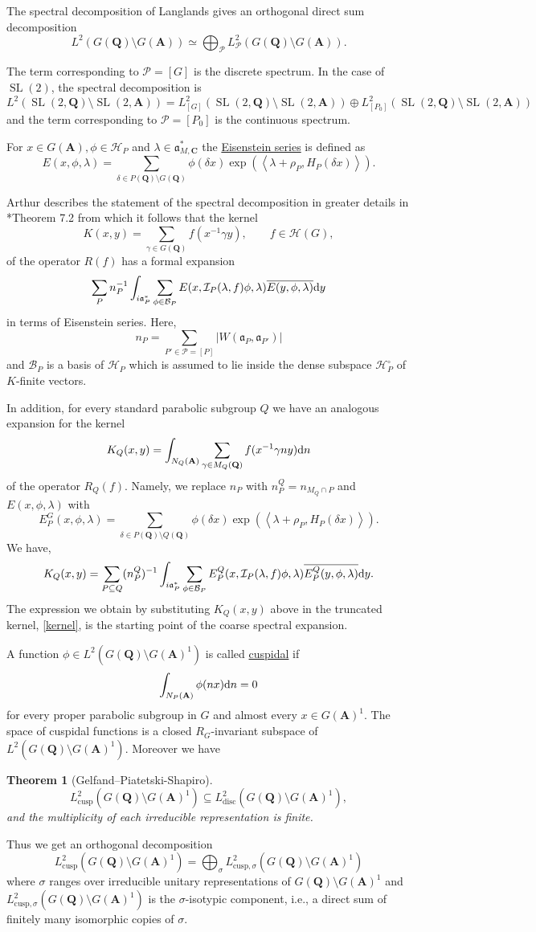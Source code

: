 \documentclass[11pt]{amsart}
\def\A{\mathbf A}
\def\C{\mathbf C}
\def\Q{\mathbf Q}
\def\BBB{\mathcal B}
\def\HHH{\mathcal H}
\def\III{\mathcal I}
\def\PPP{\mathcal P}
\def\aaa{\mathfrak a}
\def\d{\text d}
\def\bs{\setminus}
\def\cusp{\text{cusp}}
\def\disc{\text{disc}}
\def\Ltwo{L^2}
\def\mod#1{\lvert #1 \rvert} %
\def\sl{\operatorname{SL}}
\def\sprod#1#2{\left\langle #1 , #2 \right\rangle}  %
\newtheorem{theorem}{Theorem}[section]
\theoremstyle{remark}
\begin{document}
The spectral decomposition of Langlands gives an orthogonal direct sum decomposition
\[ \Ltwo(G(\Q)\bs G(\A)) \simeq \bigoplus_{\PPP} \Ltwo_\PPP(G(\Q)\bs G(\A)). \]

The term corresponding to $\PPP = [G]$ is the discrete spectrum. 
In the case of $\sl(2)$, the spectral decomposition is 
\[ \Ltwo(\sl(2, \Q)\bs \sl(2, \A)) = \Ltwo_{[G]} (\sl(2, \Q)\bs \sl(2, \A)) \oplus \Ltwo_{[P_0]} (\sl(2, \Q)\bs \sl(2, \A)) \]
and the term corresponding to $\PPP = [P_0]$ is the continuous spectrum.

For $x \in G(\A), \phi \in \HHH_P$ and $\lambda \in \aaa_{M, \C}^*$ the \underline{Eisenstein series} is defined as
\[ E(x, \phi, \lambda) = \sum_{\delta \in P(\Q) \bs G(\Q)} \phi(\delta x) 
		\exp(\sprod{\lambda + \rho_P}{H_P(\delta x)}). \]

Arthur describes the statement of the spectral decomposition in greater details in \cite{clay}*{Theorem 7.2} from which it follows that the kernel 
\[ K(x, y) = \sum_{\gamma \in G(\Q)} f(x^{-1}\gamma y) , \qquad f \in \HHH(G),\]
of the operator $R(f)$ has a formal expansion
\[ \sum_{P} n_P^{-1} \int_{i\aaa_P^*} \sum_{\phi \in \BBB_P} E(x, \III_P(\lambda, f)\phi, \lambda) 
		\overline{E(y, \phi, \lambda)} \d y \]
in terms of Eisenstein series. Here, 
\[ n_P = \sum_{P' \in \PPP = [P]} \mod{W(\aaa_P, \aaa_{P'})} \]
and $\BBB_P$ is a basis of $\HHH_P$ which is assumed to lie inside the dense subspace $\HHH_P^\circ$ of $K$-finite vectors. 

In addition, for every standard parabolic subgroup $Q$ we have an analogous expansion for the kernel 
\[ K_Q(x, y) = \int_{N_Q(\A)} \sum_{\gamma \in M_Q(\Q)} f(x^{-1}\gamma n y) \d n \]
of the operator $R_Q(f)$. Namely, we replace $n_P$ with $n_P^Q = n_{M_Q \cap P}$ and $E(x, \phi, \lambda)$ with \[ E_P^G(x, \phi, \lambda) = \sum_{\delta \in P(\Q) \bs Q(\Q)} \phi(\delta x) \exp(\sprod{\lambda + \rho_P}{H_P(\delta x)}). \]
We have, 
\[ K_Q(x, y) = \sum_{P \subseteq Q} (n_P^Q)^{-1} \int_{i\aaa_P^*} \sum_{\phi \in \BBB_P}
		E_P^Q(x, \III_P(\lambda, f)\phi, \lambda) \overline{E_P^Q(y, \phi, \lambda)} \d y. \]
The expression we obtain by substituting $K_Q(x, y)$ above in the truncated kernel, \cref{kernel}, is the starting point of the coarse spectral expansion. 

A function $\phi \in \Ltwo(G(\Q) \bs G(\A)^1)$ is called \underline{cuspidal} if 
\[ \int_{N_P(\A)} \phi(nx) \d n = 0 \]
for every proper parabolic subgroup in $G$ and almost every $x \in G(\A)^1$. The space of cuspidal functions is a closed $R_G$-invariant subspace of $\Ltwo(G(\Q)\bs G(\A)^1)$. Moreover we have
\begin{theorem} [Gelfand--Piatetski-Shapiro]
	\[ \Ltwo_\cusp(G(\Q)\bs G(\A)^1) \subseteq \Ltwo_\disc(G(\Q)\bs G(\A)^1), \]
	and the multiplicity of each irreducible representation is finite. 
\end{theorem}
Thus we get an orthogonal decomposition
\[ \Ltwo_\cusp(G(\Q)\bs G(\A)^1) = \bigoplus_\sigma \Ltwo_{\cusp, \sigma} (G(\Q)\bs G(\A)^1) \]
where $\sigma$ ranges over irreducible unitary representations of $G(\Q)\bs G(\A)^1$ and $\Ltwo_{\cusp, \sigma} (G(\Q)\bs G(\A)^1)$ is the $\sigma$-isotypic component, i.e., a direct sum of finitely many isomorphic copies of $\sigma$. 
\end{document}
